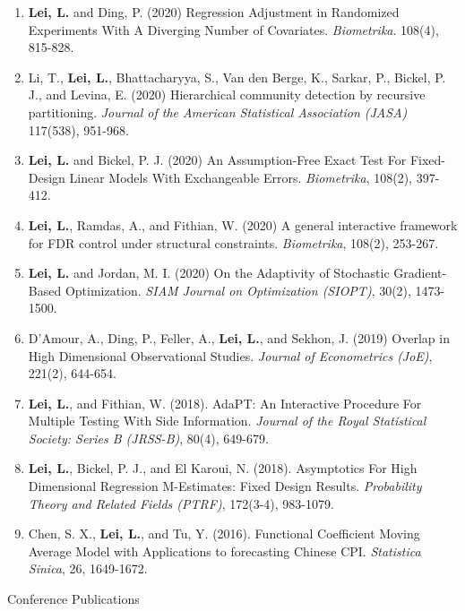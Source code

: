 \documentclass{article}
\begin{document}
\begin{enumerate}
\item \textbf{Lei, L.} and Ding, P. (2020) Regression Adjustment in Randomized Experiments With A Diverging Number of Covariates. \emph{Biometrika}. 108(4), 815-828.
\item Li, T., \textbf{Lei, L.}, Bhattacharyya, S., Van den Berge, K., Sarkar, P., Bickel, P. J., and Levina, E. (2020) Hierarchical community detection by recursive partitioning. \emph{Journal of the American Statistical Association (JASA)} 117(538), 951-968.
\item \textbf{Lei, L.} and Bickel, P. J. (2020) An Assumption-Free Exact Test For Fixed-Design Linear Models With Exchangeable Errors. \emph{Biometrika}, 108(2), 397-412.
\item \textbf{Lei, L.}, Ramdas, A., and Fithian, W. (2020) A general interactive framework for FDR control under structural constraints. \emph{Biometrika}, 108(2), 253-267.
\item \textbf{Lei, L.} and Jordan, M. I. (2020) On the Adaptivity of Stochastic Gradient-Based Optimization. \emph{SIAM Journal on Optimization (SIOPT)}, 30(2), 1473-1500.
\item D'Amour, A., Ding, P., Feller, A., \textbf{Lei, L.}, and Sekhon, J. (2019) Overlap in High Dimensional Observational Studies. \emph{Journal of Econometrics (JoE)}, 221(2), 644-654.
\item \textbf{Lei, L.}, and Fithian, W. (2018). AdaPT: An Interactive Procedure For Multiple Testing With Side Information. \emph{Journal of the Royal Statistical Society: Series B (JRSS-B)}, 80(4), 649-679.
\item \textbf{Lei, L.}, Bickel, P. J., and El Karoui, N. (2018). Asymptotics For High Dimensional Regression M-Estimates: Fixed Design Results. \emph{Probability Theory and Related Fields (PTRF)}, 172(3-4), 983-1079.
\item Chen, S. X., \textbf{Lei, L.}, and Tu, Y. (2016). Functional Coefficient Moving Average Model with Applications to forecasting Chinese CPI. \emph{Statistica Sinica}, 26, 1649-1672.
\end{enumerate}

\begin{large}
\noindent Conference Publications
\end{large}
\end{document}
